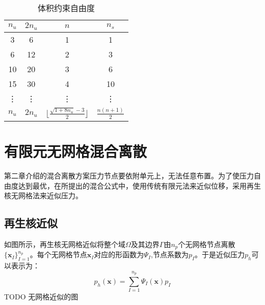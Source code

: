 \begin{table}[ht!]
    \centering
    \caption{体积约束自由度}\label{tab:constraint}
    \setlength{\tabcolsep}{10mm}
    \renewcommand{\arraystretch}{2}
    \begin{tabular}{cccc}
        \toprule
            $n_u$ & $2n_u$ & $n$ &$ n_s$\\
        \midrule
        3  & 6  & 1 & 1 \\
        6  & 12 & 2 & 3 \\
        10 & 20 & 3 & 6 \\
        15 & 30 & 4 & 10 \\
        \vdots & \vdots & \vdots & \vdots \\
        $n_u$ & $2n_u$ & $\lfloor\frac{\sqrt{1+8n_u}-3}{2}\rfloor$ & $\frac{n(n+1)}{2}$  \\
        \bottomrule
    \end{tabular}
\end{table}
\section{有限元无网格混合离散}
第二章介绍的混合离散方案压力节点要依附单元上，无法任意布置。为了使压力自由度达到最优，在所提出的混合公式中，使用传统有限元法来近似位移，采用再生核无网格法来近似压力。
\subsection{再生核近似}
如图所示，再生核无网格近似将整个域$\Omega$及其边界$\Gamma$由$n_p$个无网格节点离散$\{\boldsymbol x_I\}_{I=1}^{n_p}$。每个无网格节点$\boldsymbol x_I$对应的形函数为$\Psi_I$,节点系数为$p_I$。于是近似压力$p_h$可以表示为：
\begin{equation}
    p_h(\boldsymbol x) = \sum_{I=1}^{n_p} \Psi_I(\boldsymbol x) p_I
\end{equation}
TODO  无网格近似的图

